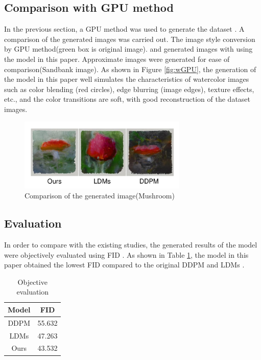 \documentclass{acsman}
\begin{document}
\subsection{Comparison with GPU method}
In the previous section, a GPU method was used to generate the dataset \cite{huang2021gpu}. A comparison of the generated images was carried out. The image style conversion by GPU method(green box is original image). and generated images with using the model in this paper. Approximate images were generated for ease of comparison(Sandbank image). As shown in Figure \ref{fig:wGPU}, the generation of the model in this paper well simulates the characteristics of watercolor images such as color blending (red circles), edge blurring (image edges), texture effects, etc., and the color transitions are soft, with good reconstruction of the dataset images.
\begin{figure}[h]
    \centering
    \includegraphics[width=8cm]{image/eva.pdf}
    \caption{Comparison of the generated image(Mushroom)}
    \label{fig:eva}
\end{figure}

\subsection{Evaluation}
In order to compare with the existing studies, the generated results of the model were objectively evaluated using FID \cite{FID}. As shown in Table \ref{tab:fid}, the model in this paper obtained the lowest FID compared to the original DDPM \cite{ho2020denoising} and LDMs \cite{rombach2022high}.
\begin{table}[htbp]
  \centering
  \caption{Objective evaluation}
  \label{tab:fid}
  \begin{tabular}{c c}
    \hline
    Model & FID  \\
    \hline
    DDPM & 55.632  \\
    LDMs & 47.263  \\
    Ours & 43.532  \\
    \hline
  \end{tabular}
\end{table}
\end{document}
